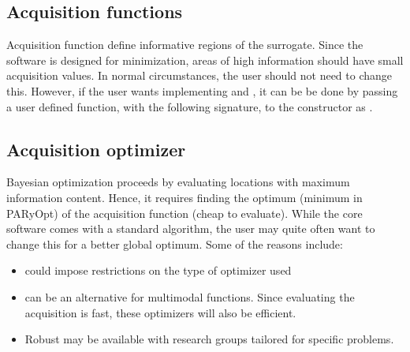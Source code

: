 \documentclass[letterpaper,12pt,english]{sphinxmanual}
\begin{document}
\subsection{Acquisition functions}
\label{\detokenize{examples/user_defined_function_example:acquisition-functions}}\label{\detokenize{examples/user_defined_function_example:ex1-acq}}
\sphinxAtStartPar
Acquisition function define informative regions of the surrogate. Since the software is designed for minimization, areas
of high information should have small acquisition values. In normal circumstances, the user should not need to change
this. However, if the user wants implementing  and , it can be be done
by passing a user defined function, with the following signature, to the constructor as
.

\begin{sphinxVerbatim}[commandchars=\\\{\}]
              
\end{sphinxVerbatim}


\subsection{Acquisition optimizer}
\label{\detokenize{examples/user_defined_function_example:acquisition-optimizer}}\label{\detokenize{examples/user_defined_function_example:ex1-acq-opt}}
\sphinxAtStartPar
Bayesian optimization proceeds by evaluating locations with maximum information content. Hence, it requires finding the
optimum (minimum in PARyOpt) of the acquisition function (cheap to evaluate). While the core software comes with a
standard  algorithm, the user may quite often want to change this for a better global optimum. Some of the
reasons include:
\begin{itemize}
\item {} 
\sphinxAtStartPar
{} could impose restrictions on the type of optimizer used

\item {} 
\sphinxAtStartPar
{} can be an alternative for multi\sphinxhyphen{}modal functions. Since evaluating the acquisition is fast,
these optimizers will also be efficient.

\item {} 
\sphinxAtStartPar
Robust  may be available with research groups tailored for specific problems.

\end{itemize}
\end{document}
